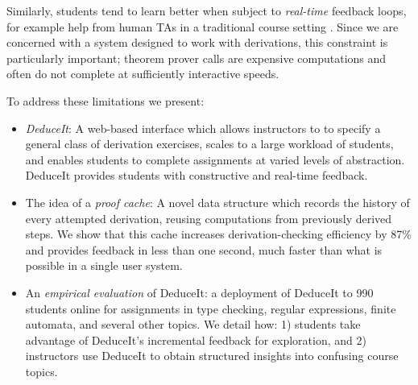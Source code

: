\documentclass{sigchi}
\begin{document}
Similarly, students tend to learn better when subject to \textit{real-time} feedback loops, for example help from human TAs in a traditional course setting \cite{personalized-feedback, derivation-scoring}. Since we are concerned with a system designed to work with derivations, this constraint is particularly important; theorem prover calls are expensive computations \cite{bisearch} and often do not complete at sufficiently interactive speeds.



To address these limitations we present:
\begin{itemize}
\item \textit{DeduceIt}: A web-based interface which allows instructors to to specify a general class of derivation exercises, 
scales to a large workload of students, and enables students to complete assignments at varied levels of abstraction. DeduceIt provides students with constructive and real-time feedback.
\item The idea of a \textit{proof cache}: A novel data structure which records the history of every attempted derivation, reusing computations from previously derived steps. We show that this cache increases derivation-checking efficiency by 87\% and provides feedback in less than one second, much faster than what is possible in a single user system.
\item An \textit{empirical evaluation} of DeduceIt: a deployment of DeduceIt to 990 students online
for assignments in type checking, regular expressions, finite automata, and several other topics. We detail how: 1) students take advantage of DeduceIt's incremental feedback for exploration, and 2) instructors use DeduceIt to obtain structured insights into confusing course topics.
\end{itemize}
\end{document}
